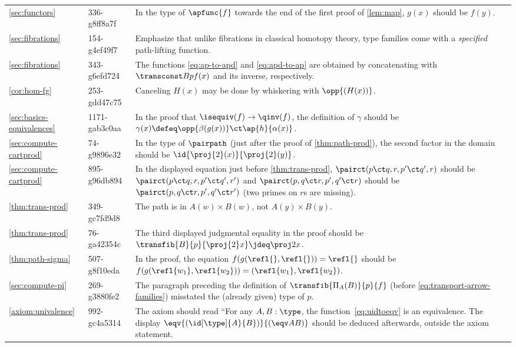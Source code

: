 \documentclass[
%
%
11pt %
]{article}
\begin{document}
\begin{longtable}{llp{10.5cm}}
  \cref{sec:functors}
  & 336-g8ff8a7f
  & In the type of $\apfunc{f}$ towards the end of the first proof of \cref{lem:map}, $g(x)$ should be $f(y)$.\\
  \cref{sec:fibrations}
  & 154-g4ef49f7
  & Emphasize that unlike fibrations in classical homotopy theory, type families come with a \emph{specified} path-lifting function.\\
  \cref{sec:fibrations}
  & 343-g6efd724
  & The functions \cref{eq:ap-to-apd} and \cref{eq:apd-to-ap} are obtained by concatenating with $\transconst Bp{f(x)}$ and its inverse, respectively.\\
  \cref{cor:hom-fg}
  & 253-gdd47c75
  & Canceling $H(x)$ may be done by whiskering with $\opp{(H(x))}$.\\
  \cref{sec:basics-equivalences}
  & 1171-gab3c0aa
  & In the proof that $\isequiv(f) \to \qinv (f)$, the definition of $\gamma$ should be $\gamma(x) \defeq \opp{\beta(g(x))} \ct \ap{h}{\alpha(x)}$.\\
  \cref{sec:compute-cartprod}
  & 74-g9896e32
  & In the type of $\pairpath$ (just after the proof of \cref{thm:path-prod}), the second factor in the domain should be $\id{\proj{2}(x)}{\proj{2}(y)}$.\\
  \cref{sec:compute-cartprod}
  & 895-g96db894
  & In the displayed equation just before \cref{thm:trans-prod}, $\pairct(p\ct q, r, p'\ct q', r)$ should be $\pairct(p\ct q, r, p'\ct q', r')$ and $\pairct(p, q\ct r, p', q'\ct r)$ should be $\pairct(p, q\ct r, p', q'\ct r')$ (two primes on $r$s are missing).\\
  \cref{thm:trans-prod}
  & 349-gc7fd9d8
  & The path is in $A(w)\times B(w)$, not $A(y)\times B(y)$.\\
  \cref{thm:trans-prod}
  & 76-ga42354c
  & The third displayed judgmental equality in the proof should be $\transfib{B}{p}{\proj{2}x} \jdeq \proj2x$.\\
  \cref{thm:path-sigma}
  & 507-g8f10eda
  & In the proof, the equation $f(g(\refl{},\refl{}))=\refl{}$ should be $f (g(\refl{w_1},\refl{w_2})) = (\refl{w_1},\refl{w_2})$.\\
  \cref{sec:compute-pi}
  & 269-g3880fe2
  & The paragraph preceding the definition of $\transfib{\Pi_A(B)}{p}{f}$ (before \cref{eq:transport-arrow-families}) misstated the (already given) type of $p$.\\
  \cref{axiom:univalence}
  & 992-gc4a5314
  & The axiom should read ``For any $A,B:\type$, the function~\eqref{eq:uidtoeqv} is an equivalence.  The display $\eqv{(\id[\type]{A}{B})}{(\eqv A B)}$ should be deduced afterwards, outside the axiom statement.\\

\end{longtable}
\end{document}
